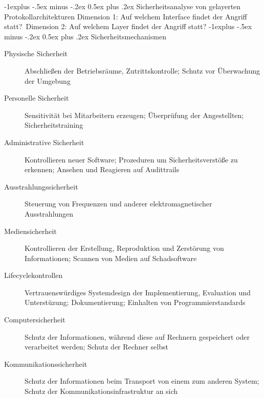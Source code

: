 \documentclass[10pt,landscape]{article}
\makeatletter
\renewcommand{\subsection}{\@startsection{subsection}{2}{0mm}%
                                {-1explus -.5ex minus -.2ex}%
                                {0.5ex plus .2ex}%
                                {\normalfont\normalsize\bfseries}}
\makeatother
\begin{document}
\begin{multicols}{3}
\subsection{Sicherheitsanalyse von gelayerten Protokollarchitekturen}
Dimension 1: Auf welchem Interface findet der Angriff statt?\
Dimension 2: Auf welchem Layer findet der Angriff statt?
\subsection{Sicherheitsmechanismen}
\begin{description}
    \item[Physische Sicherheit] Abschließen der Betriebsräume, Zutrittskontrolle; Schutz vor Überwachung der Umgebung
    \item[Personelle Sicherheit] Sensitivität bei Mitarbeitern erzeugen; Überprüfung der Angestellten; Sicherheitstraining
    \item[Administrative Sicherheit] Kontrollieren neuer Software; Prozeduren um Sicherheitsverstöße zu erkennen; Ansehen und Reagieren auf Audittrails
    \item[Ausstrahlungssicherheit] Steuerung von Frequenzen und anderer elektromagnetischer Ausstrahlungen
    \item[Mediensicherheit] Kontrollieren der Erstellung, Reproduktion und Zerstörung von Informationen; Scannen von Medien auf Schadsoftware
    \item[Lifecyclekontrollen] Vertrauenswürdiges Systemdesign der Implementierung, Evaluation und Unterstüzung; Dokumentierung; Einhalten von Programmierstandards
    \item[Computersicherheit] Schutz der Informationen, während diese auf Rechnern gespeichert oder verarbeitet werden; Schutz der Rechner selbst
    \item[Kommunikationssicherheit] Schutz der Informationen beim Transport von einem zum anderen System; Schutz der Kommunikationsinfrastruktur an sich
\end{description}

\end{multicols}
\end{document}
